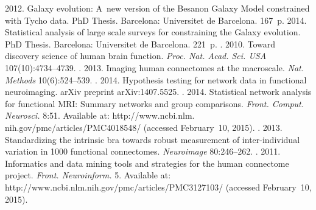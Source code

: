 \begin{multicols}{2}
{{\begin{thebibliography}{99}
 2012. Galaxy evolution: A~new version of the
Besan{\fontsize{10pt}{10pt}\selectfont{}}on
Galaxy Model constrained with Tycho data. PhD Thesis. Barcelona: Universitet de
Barcelona. 167~p.
 2014. Statistical analysis  of large scale surveys for
constraining the Galaxy evolution. PhD Thesis. Barcelona: Universitet de Barcelona.
221~p.
. 2010. Toward discovery science of
human brain function. \textit{Proc. Nat. Acad. Sci. USA}
107(10):4734--4739.
. 2013. Imaging human connectomes at the
macroscale. \textit{Nat. Methods} 10(6):524--539.
.
2014. Hypothesis testing for network data in functional neuroimaging. arXiv
preprint \mbox{arXiv}:1407.5525.
. 2014. Statistical network
analysis for functional MRI: Summary networks and group comparisons.
\textit{Front. Comput. Neurosci.} 8:51. Available at: {\sf
http://www.ncbi.nlm. nih.gov/pmc/articles/PMC4018548/} (accessed February~10,
2015).
.
2013. Standardizing the intrinsic bra towards robust measurement of inter-individual
variation in 1000 functional connectomes. \textit{Neuroimage} 80:246--262.
. 2011. Informatics and data mining tools and strategies for the
human connectome project. \textit{Front. Neuroinform.} 5. Available at:
{\sf http://www.ncbi.nlm.nih.gov/pmc/\linebreak articles/PMC3127103/} (accessed
February~10, 2015).

\columnbreak


\end{thebibliography}}}
\end{multicols}

